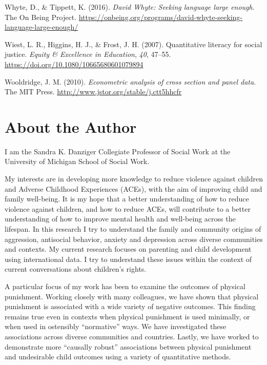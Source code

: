 \documentclass[
  letterpaper,
  DIV=11,
  numbers=noendperiod]{scrreprt}
\newlength{\cslhangindent}
\newenvironment{CSLReferences}[2] %
 {\begin{list}{}{%
  \setlength{\itemindent}{0pt}
  \setlength{\leftmargin}{0pt}
  \setlength{\parsep}{0pt}
  \ifodd #1
   \setlength{\leftmargin}{\cslhangindent}
   \setlength{\itemindent}{-1\cslhangindent}
  \fi
  \setlength{\itemsep}{#2\baselineskip}}}
 {\end{list}}
\begin{document}
\begin{CSLReferences}{1}{0}
Whyte, D., \& Tippett, K. (2016). \emph{{D}avid {W}hyte: Seeking
language large enough}. The On Being Project.
\url{https://onbeing.org/programs/david-whyte-seeking-language-large-enough/}

Wiest, L. R., Higgins, H. J., \& Frost, J. H. (2007). Quantitative
literacy for social justice. \emph{Equity \& Excellence in Education},
\emph{40}, 47--55. \url{https://doi.org/10.1080/10665680601079894}

Wooldridge, J. M. (2010). \emph{Econometric analysis of cross section
and panel data}. The MIT Press.
\url{http://www.jstor.org/stable/j.ctt5hhcfr}

\end{CSLReferences}


\chapter{About the Author}\label{about-the-author}

I am the Sandra K. Danziger Collegiate Professor of Social Work at the
University of Michigan School of Social Work.

My interests are in developing more knowledge to reduce violence against
children and Adverse Childhood Experiences (ACEs), with the aim of
improving child and family well-being. It is my hope that a better
understanding of how to reduce violence against children, and how to
reduce ACEs, will contribute to a better understanding of how to improve
mental health and well-being across the lifespan. In this research I try
to understand the family and community origins of aggression, antisocial
behavior, anxiety and depression across diverse communities and
contexts. My current research focuses on parenting and child development
using international data. I try to understand these issues within the
context of current conversations about children's rights.

A particular focus of my work has been to examine the outcomes of
physical punishment. Working closely with many colleagues, we have shown
that physical punishment is associated with a wide variety of negative
outcomes. This finding remains true even in contexts when physical
punishment is used minimally, or when used in ostensibly ``normative''
ways. We have investigated these associations across diverse communities
and countries. Lastly, we have worked to demonstrate more ``causally
robust'' associations between physical punishment and undesirable child
outcomes using a variety of quantitative methods.
\end{document}
